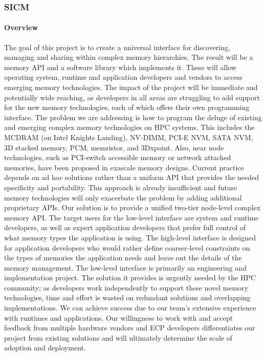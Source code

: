 \subsubsection{ SICM} 
\paragraph{Overview} The goal of this project is to create a universal interface for discovering, managing and sharing within complex memory hierarchies. The result will be a memory API and a software library which implements it. These will allow operating system, runtime and application developers and vendors to access emerging memory technologies. The impact of the project will be immediate and potentially wide reaching, as developers in all areas are struggling to add support for the new memory technologies, each of which offers their own programming interface. The problem we are addressing is how to program the deluge of existing and emerging complex memory technologies on HPC systems. This includes the MCDRAM (on Intel Knights Landing), NV-DIMM, PCI-E NVM, SATA NVM, 3D stacked memory, PCM, memristor, and 3Dxpoint. Also, near node technologies, such as PCI-switch accessible memory or network attached memories, have been proposed in exascale memory designs. Current practice depends on ad hoc solutions rather than a uniform API that provides the needed specificity and portability. This approach is already insufficient and future memory technologies will only exacerbate the problem by adding additional proprietary APIs. Our solution is to provide a unified two-tier node-level complex memory API. The target users for the low-level interface are system and runtime developers, as well as expert application developers that prefer full control of what memory types the application is using. The high-level interface is designed for application developers who would rather define coarser-level constraints on the types of memories the application needs and leave out the details of the memory management. The low-level interface is primarily an engineering and implementation project. The solution it provides is urgently needed by the HPC community; as developers work independently to support these novel memory technologies, time and effort is wasted on redundant solutions and overlapping implementations. We can achieve success due to our team’s extensive experience with runtimes and applications. Our willingness to work with and accept feedback from multiple hardware vendors and ECP developers differentiates our project from existing solutions and will ultimately determine the scale of adoption and deployment. 

